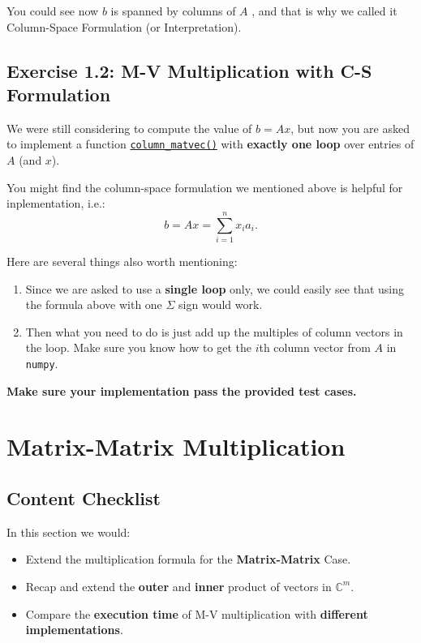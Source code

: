 \begin{note}
  You could see now \(b\)  is spanned by columns of \(A\) , and that is why we called it Column-Space Formulation (or Interpretation).
\end{note}

\subsection*{Exercise 1.2: M-V Multiplication with C-S Formulation}%
\begin{problem}
  We were still considering to compute the value of \(b = Ax\), but now you are asked to implement a function \href{https://comp-lin-alg.github.io/cla_utils.html#cla_utils.exercises1.column_matvec}{\texttt{column\_matvec()}} with \textbf{exactly one loop} over entries of \(A\) (and \(x\)).
\end{problem}
\noindent You might find the column-space formulation we mentioned above is helpful for inplementation, i.e.:
\[
b = Ax =  \sum_{i=1}^{n} x_i a_i
.\]

\begin{hint} 
Here are several things also worth mentioning:

\begin{enumerate}
\item Since we are asked to use a \textbf{single loop} only, we could easily see that using the formula above with one $\Sigma$ sign would work. 
\item Then what you need to do is just add up the multiples of column vectors in the loop. Make sure you know how to get the \(i\)th column vector from \(A\)  in \texttt{numpy}. \checked
\end{enumerate}
\textbf{Make sure your implementation pass the provided test cases.}
\end{hint}

\section{Matrix-Matrix Multiplication}%
\label{sec1.3}
\subsection*{Content Checklist}
\noindent In this section we would:
\begin{itemize}
  \item Extend the multiplication formula for the \textbf{Matrix-Matrix} Case.
  \item Recap and extend the \textbf{outer} and \textbf{inner} product of vectors in \(\mathbb{C}^{m}\).
  \item Compare the \textbf{execution time} of M-V multiplication with \textbf{different implementations}.
\end{itemize}

